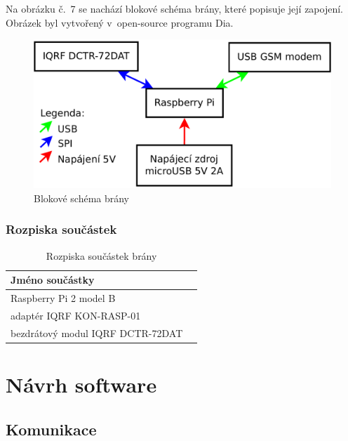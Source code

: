 \documentclass[12pt,a4paper,oneside]{article}
\begin{document}
Na obrázku č.~7 se nachází blokové schéma brány, které popisuje její zapojení. Obrázek byl vytvořený v~open-source programu Dia\cite{sw/dia}.

\begin{figure}[H]
\centering
\label{fig:blokove-schema-zasuvky}
\includegraphics[width = 128mm]{img/blokove-schema/brana.pdf}
\caption{Blokové schéma brány}
\end{figure}

\subsubsection{Rozpiska součástek}

\begin{table}[H]
  \centering
  \begin{tabular}{|l|l|}
    \hline
    \textbf{Jméno součástky} \\
    \hline
    \hline
    Raspberry Pi 2 model B \\
    \hline
    adaptér IQRF KON-RASP-01 \\
    \hline
    bezdrátový modul IQRF DCTR-72DAT \\
    \hline
  \end{tabular}
  \caption{Rozpiska součástek brány}\label{table:rozpiska-soucastek/brana}
\end{table}

\newpage

\section{Návrh software}

\subsection{Komunikace}
\end{document}
